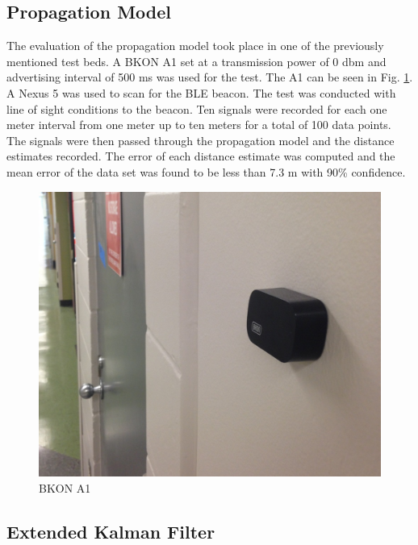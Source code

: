 \documentclass[conference]{IEEEtran}
\begin{document}
\subsection{Propagation Model}

The evaluation of the propagation model took place in one of the previously mentioned test beds. A BKON A1 set at a transmission power of 0 dbm and advertising interval of 500 ms was used for the test. The A1 can be seen in Fig. \ref{fig:bkon}. A Nexus 5 was used to scan for the BLE beacon. The test was conducted with line of sight conditions to the beacon. Ten signals were recorded for each one meter interval from one meter up to ten meters for a total of 100 data points. The signals were then passed through the propagation model and the distance estimates recorded. The error of each distance estimate was computed and the mean error of the data set was found to be less than 7.3 m with 90\% confidence.

\begin{figure}[h]
\centering
\includegraphics[scale=0.2]{BKON.jpg}
\caption{BKON A1}
\captionsetup{justification=centering,margin=2cm}
\label{fig:bkon}
\end{figure}

\subsection{Extended Kalman Filter}
\end{document}
